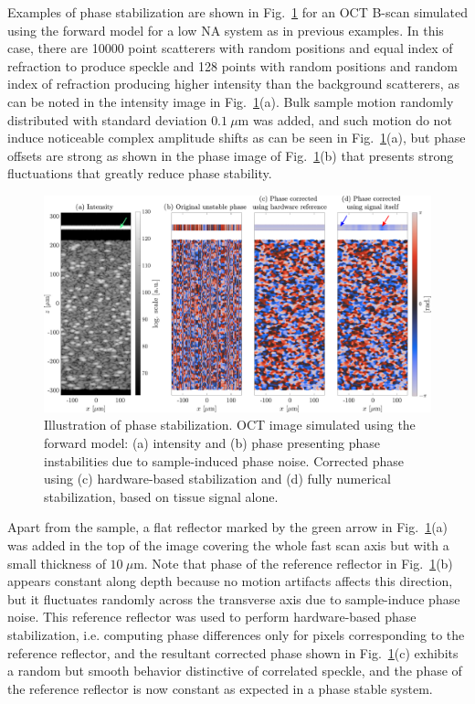 Examples of phase stabilization are shown in Fig.~\ref{fig:PhaseStabilization} for an OCT B-scan simulated using the forward model for a low NA system as in previous examples. In this case, there are 10000 point scatterers with random positions and equal index of refraction to produce speckle and 128 points with random positions and random index of refraction producing higher intensity than the background scatterers, as can be noted in the intensity image in Fig.~\ref{fig:PhaseStabilization}(a). Bulk sample motion randomly distributed with standard deviation $0.1~\mu$m was added, and such motion do not induce noticeable complex amplitude shifts as can be seen in Fig.~\ref{fig:PhaseStabilization}(a), but phase offsets are strong as shown in the phase image of Fig.~\ref{fig:PhaseStabilization}(b) that presents strong fluctuations that greatly reduce phase stability.

\begin{figure}[htb!]
	\centering
	\includegraphics[width=\textwidth]{Figures/TheoreticalBasis/PhaseStabilizationComp.pdf}
	\caption[Illustration of phase stabilization.]{Illustration of phase stabilization. OCT image simulated using the forward model: (a) intensity and (b) phase presenting phase instabilities due to sample-induced phase noise. Corrected phase using (c) hardware-based stabilization and (d) fully numerical stabilization, based on tissue signal alone.}\label{fig:PhaseStabilization}
\end{figure}

Apart from the sample, a flat reflector marked by the green arrow in Fig.~\ref{fig:PhaseStabilization}(a) was added in the top of the image covering the whole fast scan axis but with a small thickness of $10~\mu$m. Note that phase of the reference reflector in Fig.~\ref{fig:PhaseStabilization}(b) appears constant along depth because no motion artifacts affects this direction, but it fluctuates randomly across the transverse axis due to sample-induce phase noise. This reference reflector was used to perform hardware-based phase stabilization, i.e.  computing phase differences only for pixels corresponding to the reference reflector, and the resultant corrected phase shown in Fig.~\ref{fig:PhaseStabilization}(c) exhibits a random but smooth behavior distinctive of correlated speckle, and the phase of the reference reflector is now constant as expected in a phase stable system.

